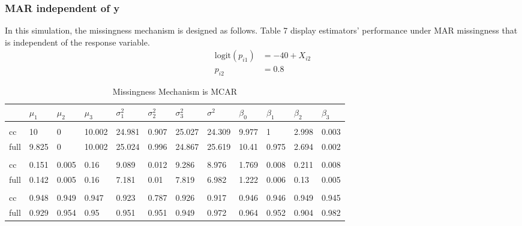 \documentclass[
  twocolumn]{article}
\begin{document}
\hypertarget{mar-independent-of-y}{%
\subsubsection{MAR independent of y}\label{mar-independent-of-y}}

In this simulation, the missingness mechanism is designed as follows.
Table 7 display estimators' performance under MAR missingness that is
independent of the response variable. \[
\begin{aligned}
\mathrm{logit}(p_{i1}) &= -40 + X_{i2} \\
p_{i2} &= 0.8
\end{aligned}
\]

\begin{table*}[hbp]
\caption{Missingness Mechanism is MCAR}
\begingroup\fontsize{7}{9}\selectfont

\begin{tabu} to 
\toprule
 & $\mu_1$ & $\mu_2$ & $\mu_3$ & $\sigma^2_1$ & $\sigma^2_2$ & $\sigma^2_3$ & $\sigma^2$ & $\beta_0$ & $\beta_1$ & $\beta_2$ & $\beta_3$\\
\midrule
\addlinespace[0.3em]
\\
\hspace{1em}cc & 10 & 0 & 10.002 & 24.981 & 0.907 & 25.027 & 24.309 & 9.977 & 1 & 2.998 & 0.003\\
\hspace{1em}full & 9.825 & 0 & 10.002 & 25.024 & 0.996 & 24.867 & 25.619 & 10.41 & 0.975 & 2.694 & 0.002\\
\addlinespace[0.3em]
\\
\hspace{1em}cc & 0.151 & 0.005 & 0.16 & 9.089 & 0.012 & 9.286 & 8.976 & 1.769 & 0.008 & 0.211 & 0.008\\
\hspace{1em}full & 0.142 & 0.005 & 0.16 & 7.181 & 0.01 & 7.819 & 6.982 & 1.222 & 0.006 & 0.13 & 0.005\\
\addlinespace[0.3em]
\\
\hspace{1em}cc & 0.948 & 0.949 & 0.947 & 0.923 & 0.787 & 0.926 & 0.917 & 0.946 & 0.946 & 0.949 & 0.945\\
\hspace{1em}full & 0.929 & 0.954 & 0.95 & 0.951 & 0.951 & 0.949 & 0.972 & 0.964 & 0.952 & 0.904 & 0.982\\
\bottomrule
\end{tabu}
\endgroup{}
\end{table*}
\end{document}
